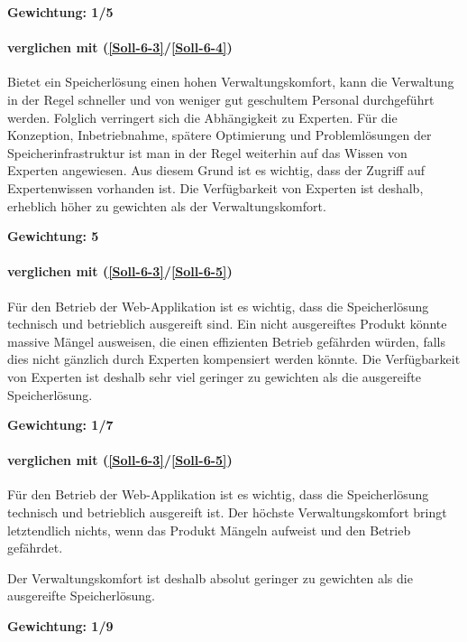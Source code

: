 \textbf{Gewichtung: 1/5}


\paragraph*{ verglichen mit  (\ref{Soll-6-3}/\ref{Soll-6-4})}
Bietet ein Speicherlösung einen hohen Verwaltungskomfort, kann die Verwaltung in der Regel schneller und von weniger gut geschultem Personal durchgeführt werden. Folglich verringert sich die Abhängigkeit zu Experten. Für die Konzeption, Inbetriebnahme, spätere Optimierung und Problemlösungen der Speicherinfrastruktur ist man in der Regel weiterhin auf das Wissen von Experten angewiesen. Aus diesem Grund ist es wichtig, dass der Zugriff auf Expertenwissen vorhanden ist. Die Verfügbarkeit von Experten ist deshalb, erheblich höher zu gewichten als der Verwaltungskomfort. 

\textbf{Gewichtung: 5}

\paragraph*{ verglichen mit  (\ref{Soll-6-3}/\ref{Soll-6-5})}
Für den Betrieb der Web-Applikation ist es wichtig, dass die Speicherlösung technisch und betrieblich ausgereift sind. Ein nicht ausgereiftes Produkt könnte massive Mängel ausweisen, die einen effizienten Betrieb gefährden würden, falls dies nicht gänzlich durch Experten kompensiert werden könnte. Die Verfügbarkeit von Experten ist deshalb sehr viel geringer zu gewichten als die ausgereifte Speicherlösung.

\textbf{Gewichtung: 1/7}

\paragraph*{ verglichen mit  (\ref{Soll-6-3}/\ref{Soll-6-5})}
Für den Betrieb der Web-Applikation ist es wichtig, dass die Speicherlösung technisch und betrieblich ausgereift ist. Der höchste Verwaltungskomfort bringt letztendlich nichts, wenn das Produkt Mängeln aufweist und den Betrieb gefährdet.

Der Verwaltungskomfort ist deshalb absolut geringer zu gewichten als die ausgereifte Speicherlösung.

\textbf{Gewichtung: 1/9}


